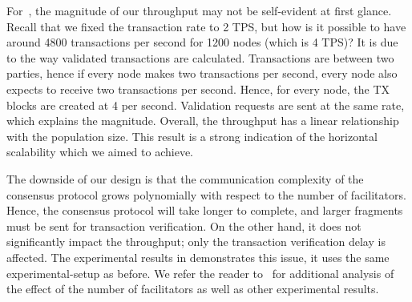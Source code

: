 For~,
the magnitude of our throughput may not be self-evident at first glance.
Recall that we fixed the transaction rate to 2 TPS,
but how is it possible to have around 4800 transactions per second for 1200 nodes (which is 4 TPS)?
It is due to the way validated transactions are calculated.
Transactions are between two parties, hence if every node makes two transactions per second,
every node also expects to receive two transactions per second.
Hence, for every node, the TX blocks are created at 4 per second.
Validation requests are sent at the same rate, which explains the magnitude.
Overall, the throughput has a linear relationship with the population size.
This result is a strong indication of the horizontal scalability which we aimed to achieve.

The downside of our design is that the communication complexity of the consensus protocol grows polynomially with respect to the number of facilitators.
Hence, the consensus protocol will take longer to complete, and larger fragments must be sent for transaction verification.
On the other hand, it does not significantly impact the throughput;
only the transaction verification delay is affected.
The experimental results in  demonstrates this issue, it uses the same experimental-setup as before.
We refer the reader to~\cite[Chapter 5]{checo} for additional analysis of the effect of the number of facilitators as well as other experimental results.

